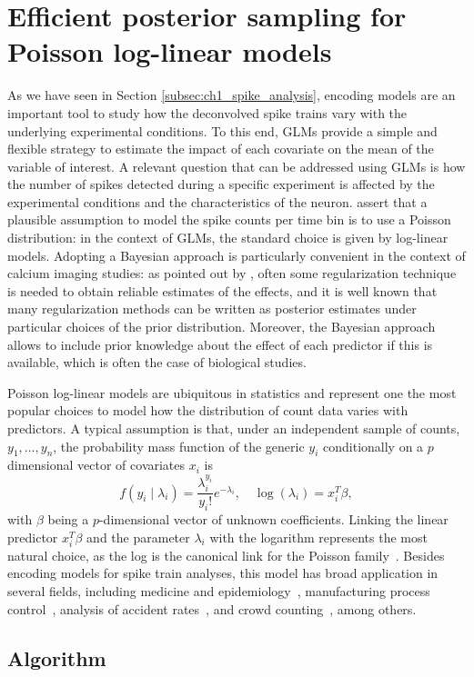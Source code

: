 \chapter{Efficient posterior sampling for Poisson log-linear models}

\fancyhead[RO,LE]{\thepage}

\setlength{\parskip}{0.5pt}

\bigskip

As we have seen in Section \ref{subsec:ch1_spike_analysis}, encoding models are an important tool to study how the deconvolved spike trains vary with the underlying experimental conditions. To this end, GLMs provide a simple and flexible strategy to estimate the impact of each covariate on the mean of the variable of interest.
A relevant question that can be addressed using GLMs is how the number of spikes detected during a specific experiment is affected by the experimental conditions and the characteristics of the neuron. \citet{paninski2007} assert that a plausible assumption to model the spike counts per time bin is to use a Poisson distribution: in the context of GLMs, the standard choice is given by log-linear models. 
Adopting a Bayesian approach is particularly convenient in the context of calcium imaging studies: as pointed out by \citet{paninski2007}, often some regularization technique is needed to obtain reliable estimates of the effects, and it is well known that many regularization methods can be written as posterior estimates under particular choices of the prior distribution.
Moreover, the Bayesian approach allows to include prior knowledge about the effect of each predictor if this is available, which is often the case of biological studies. 

Poisson log-linear models are ubiquitous in statistics and represent one the most popular choices to model how the distribution of count data varies with predictors. A typical assumption is that, under an independent sample of counts, $y_1, \dots, y_n$, the probability mass function of the generic $y_i$ conditionally on a $p$ dimensional vector of covariates $x_i$ is
\begin{equation*}
f(y_i \mid \lambda_i) =  \frac {\lambda_i^{y_i}}{{y_i}!}e^{-\lambda_i}, \quad \log(\lambda_i) = x_i^T \beta,
\label{eq:model0}
\end{equation*}
with $\beta$ being a $p$-dimensional vector of unknown coefficients. Linking the linear predictor $x_i^T \beta$ and the parameter $\lambda_i$ with the logarithm represents the most natural choice, as the log is the canonical link for the Poisson family~\citep{nelder1972glm}.
Besides encoding models for spike train analyses, this model has broad application in several fields, including medicine and epidemiology~\citep{Frome1983, frome1985, Hutchinson2005}, manufacturing process control~\citep{lambert1992}, analysis of accident rates~\citep{Sarath1990, Miaou1994}, and crowd counting~\citep{chan2009}, among others.



\section{Algorithm} 
\noindent

